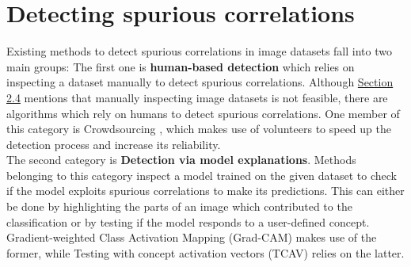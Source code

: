 \documentclass{article}
\begin{document}
\section{Detecting spurious correlations}
Existing methods to detect spurious correlations in image datasets fall into two main groups: The first one is \textbf{human-based detection}
which relies on inspecting a dataset manually to detect spurious correlations. Although \hyperref[sec:challenges]{Section 2.4}
mentions that manually inspecting image datasets is not feasible,
there are algorithms which rely on humans to detect spurious correlations. One member of this category is
Crowdsourcing \cite{10.1145/3366423.3380063}, which makes use of volunteers to speed up the detection process and increase its reliability. \\
The second category is \textbf{Detection via model explanations}. Methods belonging to this category inspect a model trained on
the given dataset to check if the model exploits spurious correlations to make its predictions.
This can either be done by highlighting the parts of an image which contributed to the classification or by testing if the
model responds to a user-defined concept. Gradient-weighted Class Activation Mapping (Grad-CAM) \cite{Selvaraju_2017_ICCV}
makes use of the former, while Testing with concept activation vectors (TCAV) \cite{pmlr-v80-kim18d} relies on the latter.
\end{document}
